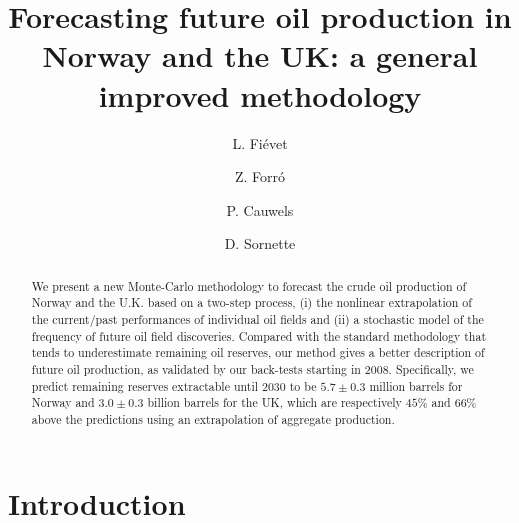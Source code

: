 \documentclass[review]{elsarticle}
\begin{document}
\thispagestyle{fancy} 


\title{Forecasting future oil production in Norway and the UK: a general improved methodology}

\author[eth-mtec]{L. Fi\'evet}

\author[eth-mtec]{Z. Forr\'o}

\author[eth-mtec]{P. Cauwels}

\author[eth-mtec]{D. Sornette}


\address[eth-mtec]{Chair of Entrepreneurial Risks, ETH Z\"urich, Scheuchzerstrasse 7 (SEC F), CH-8092 Z\"urich, Switzerland}


\maketitle
\begin{abstract}
\noindent We present a new Monte-Carlo methodology to forecast
the crude oil production of Norway and the U.K. based on a two-step process,
(i) the nonlinear extrapolation of the current/past
performances of individual oil fields and (ii) a stochastic model
of the frequency of future oil field discoveries. Compared
with the standard methodology that tends to underestimate remaining oil reserves,
our method gives a better description of future oil production, as validated by
our back-tests starting in 2008. Specifically, we predict remaining reserves
extractable until 2030 to be $5.7 \pm 0.3$ million barrels for Norway and $3.0 \pm0.3$ billion
barrels for the UK, which are respectively $45\%$ and $66\%$ above the
predictions using an extrapolation of aggregate production.
\end{abstract}

\section{Introduction}
\end{document}
